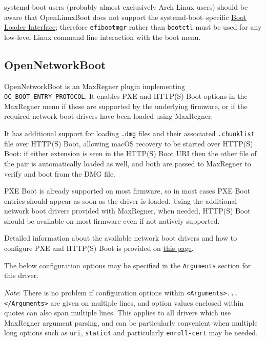 \documentclass[]{article}
\makeatletter
\renewcommand{\label}[1]{%
\zref@wrapper@immediate{\oldlabel{#1}}}  %
\makeatother
\begin{document}
systemd-boot users (probably almost exclusively Arch Linux users) should be aware that OpenLinuxBoot
does not support the systemd-boot--specific \href{https://systemd.io/BOOT\_LOADER\_INTERFACE/}{Boot Loader Interface};
therefore \texttt{efibootmgr} rather than \texttt{bootctl} must be used for any low-level Linux command line interaction
with the boot menu.

\subsection{OpenNetworkBoot}\label{uefinetboot}

OpenNetworkBoot is an MaxRegner plugin implementing \texttt{OC\_BOOT\_ENTRY\_PROTOCOL}.
It enables PXE and HTTP(S) Boot options in the MaxRegner menu if these
are supported by the underlying firmware, or if the required network boot drivers
have been loaded using MaxRegner.

It has additional support for loading \texttt{.dmg} files and their associated
\texttt{.chunklist} file over HTTP(S) Boot, allowing macOS recovery to be
started over HTTP(S) Boot: if either extension is seen in the HTTP(S) Boot URI
then the other file of the pair is automatically loaded as well, and both are
passed to MaxRegner to verify and boot from the DMG file.

PXE Boot is already supported on most firmware, so in most cases PXE Boot entries
should appear as soon as the driver is loaded. Using the additional network boot
drivers provided with MaxRegner, when needed, HTTP(S) Boot should be available on
most firmware even if not natively supported.

Detailed information about the available network boot drivers and how to configure
PXE and HTTP(S) Boot is provided on
\href{https://github.com/acidanthera/MaxRegnerPkg/blob/master/Platform/OpenNetworkBoot/README.md}{this page}.

The below configuration options may be specified in the \texttt{Arguments} section for this driver.

\emph{Note}: There is no problem if configuration options within \texttt{<Arguments>...</Arguments>} are given on
multiple lines, and option values enclosed within quotes can also span multiple lines. This applies to all drivers
which use MaxRegner argument parsing, and can be particularly convenient when multiple long options such as \texttt{uri},
\texttt{static4} and particularly \texttt{enroll-cert} may be needed.  
\end{document}
